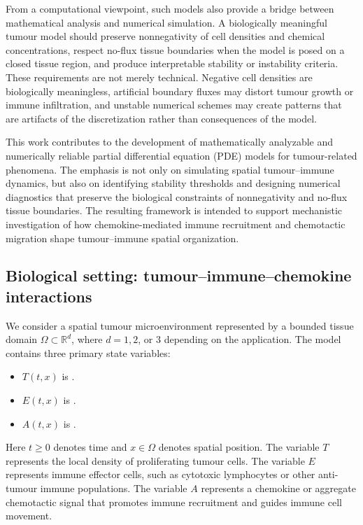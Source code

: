 \documentclass[a4paper,fleqn,longmktitle]{cas-sc}
\theoremstyle{plain}
\theoremstyle{definition}
\numberwithin{equation}{section}
\begin{document}
From a computational viewpoint, such models also provide a bridge between
mathematical analysis and numerical simulation. A biologically meaningful tumour
model should preserve nonnegativity of cell densities and chemical
concentrations, respect no-flux tissue boundaries when the model is posed on a
closed tissue region, and produce interpretable stability or instability
criteria. These requirements are not merely technical. Negative cell densities
are biologically meaningless, artificial boundary fluxes may distort tumour
growth or immune infiltration, and unstable numerical schemes may create
patterns that are artifacts of the discretization rather than consequences of
the model.

This work contributes to the development of mathematically analyzable and
numerically reliable partial differential equation (PDE) models for tumour-related
phenomena. The emphasis is not only on simulating spatial tumour--immune
dynamics, but also on identifying stability thresholds and designing numerical
diagnostics that preserve the biological constraints of nonnegativity and
no-flux tissue boundaries. The resulting framework is intended to support
mechanistic investigation of how chemokine-mediated immune recruitment and
chemotactic migration shape tumour--immune spatial organization.

\subsection{Biological setting: tumour--immune--chemokine interactions}
\label{subsec:biological-setting}

We consider a spatial tumour microenvironment represented by a bounded tissue
domain $\Omega\subset\mathbb R^d$, where $d=1,2$, or $3$ depending on the
application. The model contains three primary state variables: 
\begin{itemize}
    \item $T(t,x)$ is .
    \item $E(t,x)$ is .
    \item $A(t,x)$ is .
\end{itemize}

Here $t\ge 0$ denotes time and $x\in\Omega$ denotes spatial position. The
variable $T$ represents the local density of proliferating tumour cells. The
variable $E$ represents immune effector cells, such as cytotoxic lymphocytes or
other anti-tumour immune populations. The variable $A$ represents a chemokine or
aggregate chemotactic signal that promotes immune recruitment and guides immune
cell movement.
\end{document}
